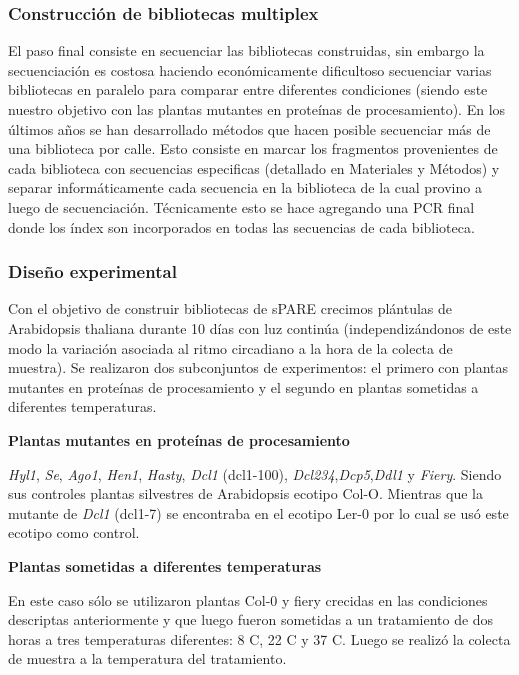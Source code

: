 \subsubsection{Construcción de bibliotecas multiplex}
El paso final consiste en secuenciar las bibliotecas construidas, sin embargo la secuenciación es costosa haciendo económicamente dificultoso secuenciar varias bibliotecas en paralelo para comparar entre diferentes condiciones (siendo este nuestro objetivo con las plantas mutantes en proteínas de procesamiento).
En los últimos años se han desarrollado métodos que hacen posible secuenciar más de una biblioteca por calle.
Esto consiste en marcar los fragmentos provenientes de cada biblioteca con secuencias especificas (detallado en Materiales y Métodos) y separar informáticamente cada secuencia en la biblioteca de la cual provino a luego de secuenciación.
Técnicamente esto se hace agregando una PCR final donde los índex son incorporados en todas las secuencias de cada biblioteca.

\subsubsection{Diseño experimental}

Con el objetivo de construir bibliotecas de sPARE crecimos plántulas de Arabidopsis thaliana durante 10 días con luz continúa (independizándonos de este modo la variación asociada al ritmo circadiano a la hora de la colecta de muestra).
Se realizaron dos subconjuntos de experimentos: el primero con plantas mutantes en proteínas de procesamiento y el segundo en plantas sometidas a diferentes temperaturas.

\textbf{Plantas mutantes en proteínas de procesamiento}

\textit{Hyl1}, \textit{Se}, \textit{Ago1}, \textit{Hen1}, \textit{Hasty}, \textit{Dcl1} (dcl1-100), \textit{Dcl234},\textit{Dcp5},\textit{Ddl1} y \textit{Fiery}.
Siendo sus controles plantas silvestres de Arabidopsis ecotipo Col-O.
Mientras que la mutante de  \textit{Dcl1} (dcl1-7) se encontraba en el ecotipo Ler-0 por lo cual se usó este ecotipo como control.

\textbf{Plantas sometidas a diferentes temperaturas}

En este caso sólo se utilizaron plantas Col-0 y fiery crecidas en las condiciones descriptas anteriormente y que luego fueron sometidas a un tratamiento de dos horas a tres temperaturas diferentes: 8 \degree C, 22 \degree C y 37 \degree C.
Luego se realizó la colecta de muestra a la temperatura del tratamiento. 

